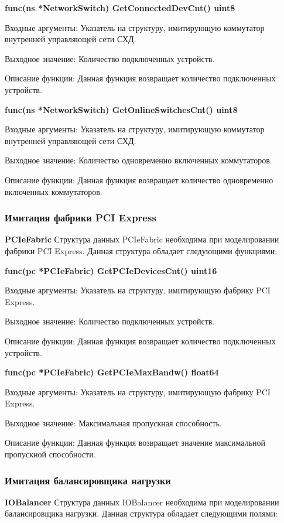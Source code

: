 \textbf{func(ns *NetworkSwitch) GetConnectedDevCnt() uint8}

Входные аргументы: Указатель на структуру, имитирующую коммутатор внутренней управляющей сети СХД.

Выходное значение: Количество подключенных устройств.

Описание функции: Данная функция возвращает количество подключенных устройств.

\textbf{func(ns *NetworkSwitch) GetOnlineSwitchesCnt() uint8}

Входные аргументы: Указатель на структуру, имитирующую коммутатор внутренней управляющей сети СХД.

Выходное значение: Количество одновременно включенных коммутаторов.

Описание функции: Данная функция возвращает количество одновременно включенных коммутаторов.

\subsubsection{Имитация фабрики PCI Express}
\textbf{PCIeFabric}
Структура данных PCIeFabric необходима при моделировании фабрики PCI Express. Данная структура обладает следующими функциями:

\textbf{func(pc *PCIeFabric) GetPCIeDevicesCnt() uint16}

Входные аргументы: Указатель на структуру, имитирующую фабрику PCI Express.

Выходное значение: Количество подключенных устройств.

Описание функции: Данная функция возвращает количество подключенных устройств.


\textbf{func(pc *PCIeFabric) GetPCIeMaxBandw() float64}

Входные аргументы: Указатель на структуру, имитирующую фабрику PCI Express.

Выходное значение: Максимальная пропускная способность.

Описание функции: Данная функция возвращает значение максимальной пропускной способности.

\subsubsection{Имитация балансировщика нагрузки}
\textbf{IOBalancer}
Структура данных IOBalancer необходима при моделировании балансировщика нагрузки. Данная структура обладает следующими полями:

